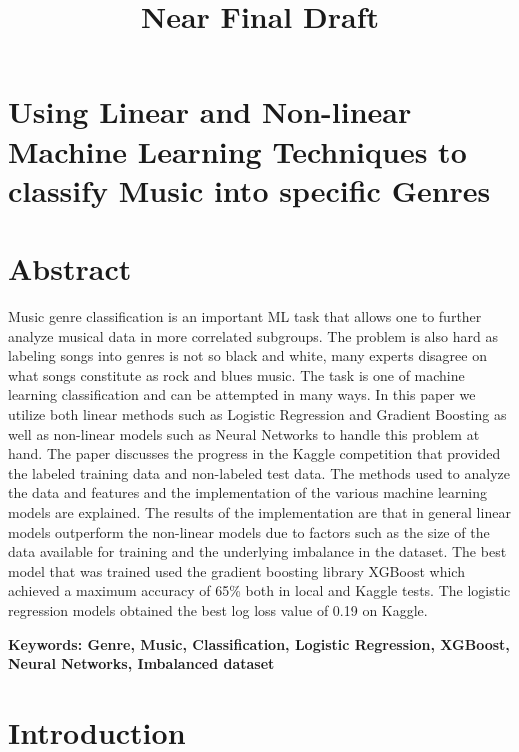 \documentclass[11pt]{article}
\title{Near Final Draft}
\begin{document}
    
    
    \maketitle
    
    

    
    \hypertarget{using-linear-and-non-linear-machine-learning-techniques-to-classify-music-into-specific-genres}{%
\section{Using Linear and Non-linear Machine Learning Techniques to
classify Music into specific
Genres}\label{using-linear-and-non-linear-machine-learning-techniques-to-classify-music-into-specific-genres}}

    \hypertarget{abstract}{%
\section{Abstract}\label{abstract}}

Music genre classification is an important ML task that allows one to
further analyze musical data in more correlated subgroups. The problem
is also hard as labeling songs into genres is not so black and white,
many experts disagree on what songs constitute as rock and blues music.
The task is one of machine learning classification and can be attempted
in many ways. In this paper we utilize both linear methods such as
Logistic Regression and Gradient Boosting as well as non-linear models
such as Neural Networks to handle this problem at hand. The paper
discusses the progress in the Kaggle competition that provided the
labeled training data and non-labeled test data. The methods used to
analyze the data and features and the implementation of the various
machine learning models are explained. The results of the implementation
are that in general linear models outperform the non-linear models due
to factors such as the size of the data available for training and the
underlying imbalance in the dataset. The best model that was trained
used the gradient boosting library XGBoost which achieved a maximum
accuracy of 65\% both in local and Kaggle tests. The logistic regression
models obtained the best log loss value of 0.19 on Kaggle.

\textbf{Keywords: Genre, Music, Classification, Logistic Regression,
XGBoost, Neural Networks, Imbalanced dataset}

    \hypertarget{introduction}{%
\section{Introduction}\label{introduction}}
\end{document}
